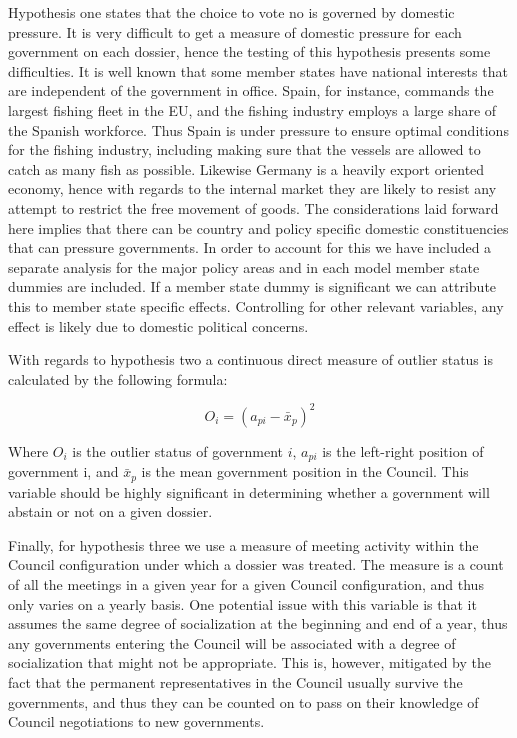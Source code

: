 Hypothesis one states that the choice to vote no is governed by domestic pressure. It is very difficult to get a measure of domestic pressure for each government on each dossier, hence the testing of this hypothesis presents some difficulties. It is well known that some member states have national interests that are independent of the government in office. Spain, for instance, commands the largest fishing fleet in the EU, and the fishing industry employs a large share of the Spanish workforce. Thus Spain is under pressure to ensure optimal conditions for the fishing industry, including making sure that the vessels are allowed to catch as many fish as possible. Likewise Germany is a heavily export oriented economy, hence with regards to the internal market they are likely to resist any attempt to restrict the free movement of goods. The considerations laid forward here implies that there can be country and policy specific domestic constituencies that can pressure governments. In order to account for this we have included a separate analysis for the major policy areas and in each model member state dummies are included. If a member state dummy is significant we can attribute this to member state specific effects. Controlling for other relevant variables, any effect is likely due to domestic political concerns.  

With regards to hypothesis two a continuous direct measure of outlier status is calculated by the following formula:

\begin{equation}
  \label{eq:4}
  O_i = (a_{pi} - \bar{x}_{p})^2
\end{equation}

Where $O_i$ is the outlier status of government $i$, $a_{pi}$ is the left-right position of government i, and $\bar{x}_{p}$ is the mean government position in the Council. This variable should be highly significant in determining whether a government will abstain or not on a given dossier. 

Finally, for hypothesis three we use a measure of meeting activity within the Council configuration under which a dossier was treated. The measure is a count of all the meetings in a given year for a given Council configuration, and thus only varies on a  yearly basis. One potential issue with this variable is that it assumes the same degree of socialization at the beginning and end of a year, thus any governments entering the Council will be associated with a degree of socialization that might not be appropriate. This is, however, mitigated by the fact that the permanent representatives in the Council usually survive the governments, and thus they can be counted on to pass on their knowledge of Council negotiations to new governments. 

